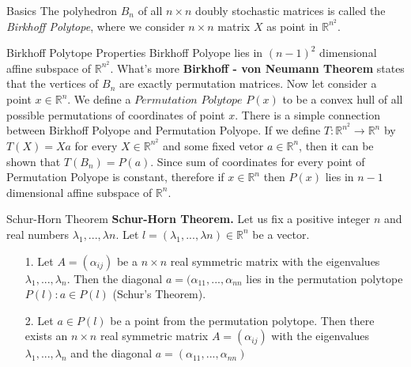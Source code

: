 \documentclass[a0paper,portrait]{xebaposter}
\begin{document}
\begin{poster}
\begin{posterbox}[name=intro,column=0,row=0, span=2]{Basics}
    The polyhedron $B_{n}$ of all $n \times n$ doubly stochastic matrices is called the \textit{Birkhoff Polytope}, where  
    we consider  $n \times n $ matrix $X$ as point in $\mathbb{R}^{n^2}$.
    \newline
\end{posterbox}

\begin{posterbox}[name=BP_properties,column=0,row=1,span=2,below=intro]{Birkhoff Polytope Properties}
Birkhoff Polyope lies in $(n-1)^2$ dimensional affine subspace of $\mathbb{R}^{n^2}$. \newline 
What's more  \textbf{Birkhoff - von Neumann Theorem} states that the vertices of $B_n$ are exactly permutation matrices. \newline 
Now let consider a point $x \in \mathbb{R}^n$. We define a $\textit{Permutation Polytope}$ $P(x)$ to be a convex hull of all possible permutations of coordinates of  point $x$.
There is a simple connection between Birkhoff Polyope and Permutation Polyope. 
If we define $T: \mathbb{R}^{n^2} \rightarrow \mathbb{R}^n$ by $T(X) = Xa$ for every $X \in \mathbb{R}^{n^2}$ and some fixed vetor $a \in \mathbb{R}^n$,
then it can be shown that $T(B_n) = P(a)$. \newline
Since sum of coordinates for every point of Permutation Polyope is constant, therefore if $x \in \mathbb{R}^n$ then $P(x)$ lies in $n-1$ dimensional affine subspace of $\mathbb{R}^n$.
\newline
\end{posterbox}

\begin{posterbox}[name=Schur,column=0,row=2,below=BP_properties]{Schur-Horn Theorem}
\textbf{Schur-Horn Theorem.} Let us fix a positive integer $n$ and real numbers $\lambda_{1},...,\lambda{n}$. Let $l=(\lambda_{1},...,\lambda{n}) \in \mathbb{R}^n$ be a vector.
    \begin{enumerate}
        \item [1.] Let $A=(\alpha_{ij})$ be a $n\times n$ real symmetric matrix with the eigenvalues $\lambda_{1},...,\lambda_{n}$. Then the diagonal $a = (\alpha_{11},...,\alpha_{nn}$ lies in the permutation polytope $P(l): a \in P(l)$ (Schur's Theorem).
        \item[2.] Let $a \in P(l)$ be a point from the permutation polytope. Then there exists an $n \times n$ real symmetric matrix $A=(\alpha_{ij})$ with the eigenvalues $\lambda_{1},...,\lambda_{n}$ and the diagonal $a = (\alpha_{11},...,\alpha_{nn})$
    \end{enumerate}
\end{posterbox}



\end{poster}
\end{document}
